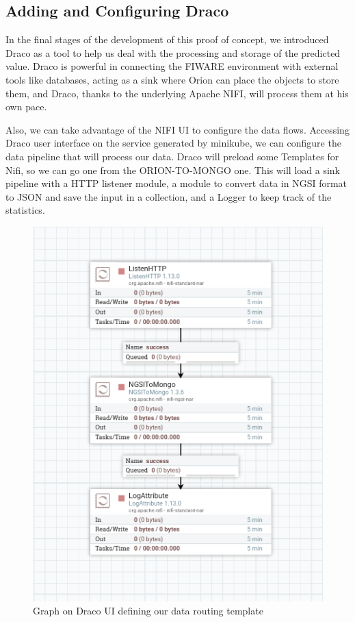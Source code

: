 \subsection{Adding and Configuring Draco}

In the final stages of the development of this proof of concept, we introduced Draco as a tool to help us deal with the processing and storage of the predicted value. Draco is powerful in connecting the FIWARE environment with external tools like databases, acting as a sink where Orion can place the objects to store them, and Draco, thanks to the underlying Apache NIFI, will process them at his own pace.

Also, we can take advantage of the NIFI UI to configure the data flows. Accessing Draco user interface on the service generated by minikube, we can configure the data pipeline that will process our data. Draco will preload some Templates for Nifi, so we can go one from the ORION-TO-MONGO one. This will load a sink pipeline with a HTTP listener module, a module to convert data in NGSI format to JSON and save the input in a collection, and a Logger to keep track of the statistics.

\begin{figure}[H]
	\centering
	\includegraphics[width=0.7\linewidth]{imagenes/draco-data-routing.png}
	\caption{Graph on Draco UI defining our data routing template}
	\label{draco-data-routing}
\end{figure}

